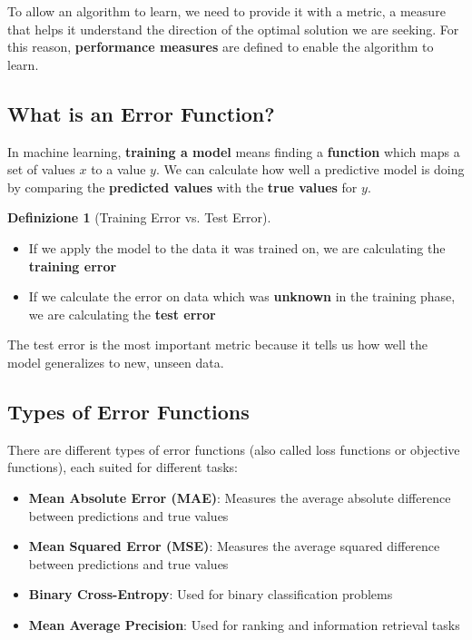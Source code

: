 \documentclass[11pt,a4paper]{article}
\theoremstyle{definition}
\newtheorem{definition}{Definizione}[section]
\theoremstyle{plain}
\theoremstyle{remark}
\begin{document}
To allow an algorithm to learn, we need to provide it with a metric, a measure that helps it understand the direction of the optimal solution we are seeking. For this reason, \textbf{performance measures} are defined to enable the algorithm to learn.

\subsection{What is an Error Function?}

In machine learning, \textbf{training a model} means finding a \textbf{function} which maps a set of values $x$ to a value $y$. We can calculate how well a predictive model is doing by comparing the \textbf{predicted values} with the \textbf{true values} for $y$.

\begin{definition}[Training Error vs. Test Error]
\begin{itemize}
    \item If we apply the model to the data it was trained on, we are calculating the \textbf{training error}
    \item If we calculate the error on data which was \textbf{unknown} in the training phase, we are calculating the \textbf{test error}
\end{itemize}
\end{definition}

The test error is the most important metric because it tells us how well the model generalizes to new, unseen data.

\subsection{Types of Error Functions}

There are different types of error functions (also called loss functions or objective functions), each suited for different tasks:

\begin{itemize}
    \item \textbf{Mean Absolute Error (MAE)}: Measures the average absolute difference between predictions and true values
    \item \textbf{Mean Squared Error (MSE)}: Measures the average squared difference between predictions and true values
    \item \textbf{Binary Cross-Entropy}: Used for binary classification problems
    \item \textbf{Mean Average Precision}: Used for ranking and information retrieval tasks
\end{itemize}
\end{document}
